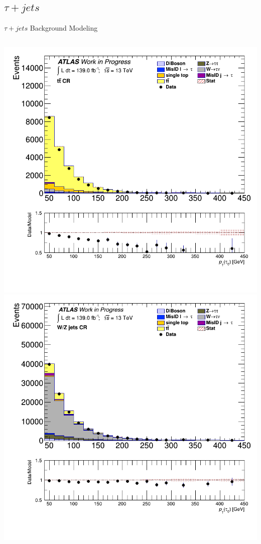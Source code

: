 \documentclass[aspectratio=169,xcolor=table]{beamer}
\begin{document}
    \subsection{$\tau+jets$}
      \begin{frame}[t]{$\tau+jets$ Background Modeling}
          \begin{columns}[t]

          \includegraphics[height=.45\textheight,keepaspectratio=true]{taujet_1p_3p/v09/tau_0_pt_TTBAR.png}
          \includegraphics[height=.45\textheight,keepaspectratio=true]{taujet_1p_3p/v09/tau_0_pt_WJETS.png}


\end{columns}
\end{frame}
\end{document}
